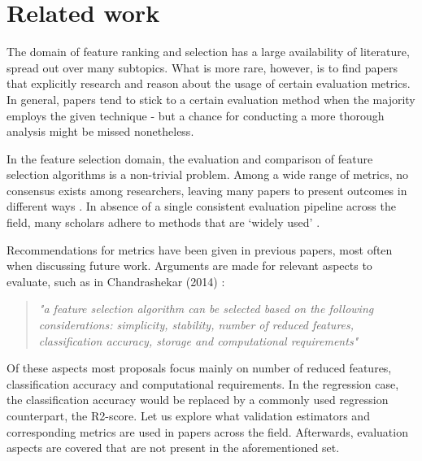 \documentclass[../main.tex]{subfiles}
\begin{document}
\section{Related work}\label{section:related-work}
The domain of feature ranking and selection has a large availability of literature, spread out over many subtopics. What is more rare, however, is to find papers that explicitly research and reason about the usage of certain evaluation metrics. In general, papers tend to stick to a certain evaluation method when the majority employs the given technique - but a chance for conducting a more thorough analysis might be missed nonetheless.

In the feature selection domain, the evaluation and comparison of feature selection algorithms is a non-trivial problem. Among a wide range of metrics, no consensus exists among researchers, leaving many papers to present outcomes in different ways \citep{guyon_introduction_2003}. In absence of a single consistent evaluation pipeline across the field, many scholars adhere to methods that are `widely used' \citep{solorio-fernandez_review_2020} \citep{li_feature_2017}.

Recommendations for metrics have been given in previous papers, most often when discussing future work. Arguments are made for relevant aspects to evaluate, such as in Chandrashekar (2014) \citep{chandrashekar_survey_2014}:

\begin{quote}\textit{"a feature selection algorithm can be selected based on the following considerations: simplicity, stability, number of reduced features, classification accuracy, storage and computational requirements"}\end{quote}

Of these aspects most proposals focus mainly on number of reduced features, classification accuracy and computational requirements. In the regression case, the classification accuracy would be replaced by a commonly used regression counterpart, the R2-score. Let us explore what validation estimators and corresponding metrics are used in papers across the field. Afterwards, evaluation aspects are covered that are not present in the aforementioned set.
\end{document}
